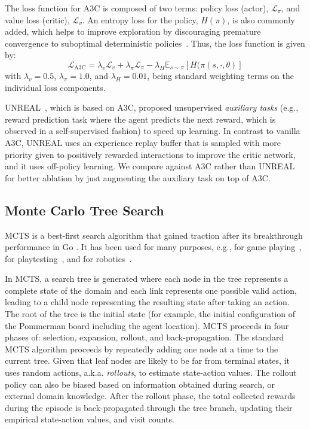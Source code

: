 \documentclass[letterpaper]{article} %
\begin{document}
The loss function for A3C is composed of two terms: policy loss (actor), $\mathcal{L}_{\pi}$, and value loss (critic), $\mathcal{L}_{v}$. An entropy loss for the policy, $H(\pi)$, is also commonly added, which helps to improve exploration by discouraging premature convergence to suboptimal deterministic policies~\cite{mnih2016asynchronous}. Thus, the loss function is given by: $$\mathcal{L}_{\text{A3C}} = \lambda_v  \mathcal{L}_{v} + \lambda_{\pi} \mathcal{L}_{\pi} - \lambda_{H} \mathbb{E}_{s \sim \pi} [H(\pi(s, \cdot, \theta)] $$ with $\lambda_{v}=0.5$, $\lambda_{\pi}=1.0$, and $\lambda_{H}=0.01$, being standard weighting terms on the individual loss components.

UNREAL~\cite{jaderberg2016reinforcement}, which is based on A3C, proposed unsupervised \emph{auxiliary tasks} (e.g., reward prediction task where the agent predicts the next reward, which is observed in a self-supervised fashion) to speed up learning. In contrast to vanilla A3C, UNREAL uses an experience replay buffer that is sampled with more priority given to positively rewarded interactions to improve the critic network, and it uses off-policy learning. We compare against A3C rather than UNREAL for better ablation by just augmenting the auxiliary task on top of A3C.


\subsection{Monte Carlo Tree Search}

MCTS is a best-first search algorithm that gained traction after its breakthrough performance in Go \cite{coulom2006efficient}. It has been used for many purposes, e.g., for game playing~\cite{sturtevant2015monte,silver2016mastering}, for playtesting~\cite{zook2015monte,holmgaard2018automated,borovikov2019winning}, and for robotics~\cite{kartal2015stochastic,best2019dec}.

In MCTS, a search tree is generated where each node in the tree represents a complete state of the domain and each link represents one possible valid action, leading to a child node representing the resulting state after taking an action. The root of the tree is the initial state (for example, the initial configuration of the Pommerman board including the agent location).
MCTS proceeds in four phases of: selection, expansion, rollout, and back-propagation. The standard MCTS algorithm proceeds by repeatedly adding one node at a time to the current tree. Given that leaf nodes are likely to be far from terminal states, it uses random actions, a.k.a. \textit{rollouts}, to estimate state-action values. The rollout policy can also be biased based on information obtained during search, or external domain knowledge. After the rollout phase, the total collected rewards during the episode is back-propagated through the tree branch, updating their empirical state-action values, and visit counts.
\end{document}

